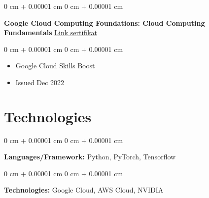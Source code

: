 \documentclass[10pt, letterpaper]{article}
\newenvironment{highlights}{
    \begin{itemize}[
        topsep=0.10 cm,
        parsep=0.10 cm,
        partopsep=0pt,
        itemsep=0pt,
        leftmargin=0 cm + 10pt
    ]
}{
    \end{itemize}
} %
\newenvironment{onecolentry}{
    \begin{adjustwidth}{
        0 cm + 0.00001 cm
    }{
        0 cm + 0.00001 cm
    }
}{
    \end{adjustwidth}
} %
\newenvironment{twocolentry}[2][]{
    \onecolentry
    \def\secondColumn{#2}
    \setcolumnwidth{\fill, 4.5 cm}
    \begin{paracol}{2}
}{
    \switchcolumn \raggedleft \secondColumn
    \end{paracol}
    \endonecolentry
} %
\begin{document}
    
        \begin{twocolentry}{
            \href{https://www.cloudskillsboost.google/public_profiles/33eeae7f-8b2d-4f96-ac63-3e13b0294e1f/badges/3072143?utm_medium=social&utm_source=linkedin&utm_campaign=ql-social-share}{Link sertifikat}
        }
            \textbf{
Google Cloud Computing Foundations: Cloud Computing Fundamentals}\end{twocolentry}

        \vspace{0.10 cm}
        \begin{onecolentry}
            \begin{highlights}
                \item Google Cloud Skills Boost
                \item Issued Dec 2022
            \end{highlights}
        \end{onecolentry}

        \vspace{0.2 cm}

        

    

    \section{Technologies}

        \begin{onecolentry}
            \textbf{Languages/Framework:} Python, PyTorch, Tensorflow
        \end{onecolentry}

        \vspace{0.2 cm}

        \begin{onecolentry}
            \textbf{Technologies:} Google Cloud, AWS Cloud, NVIDIA
        \end{onecolentry}
\end{document}
